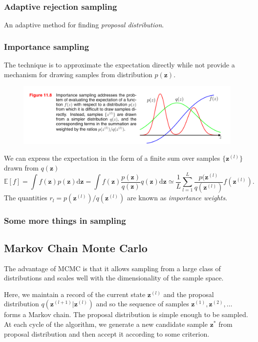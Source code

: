 \documentclass[a4paper]{book}
\newcommand{\mbf}{\mathbf}
\newcommand{\ud}{\mathrm{d}}
\newcommand{\zz}{\mbf z}
\newcommand{\Exp}{\mathbb{E}}
\newcommand{\tit}{\textit}
\begin{document}
\subsubsection*{Adaptive rejection sampling}
An adaptive method for finding \tit{proposal distribution}.
\subsubsection*{Importance sampling}
The technique is to approximate the expectation directly while not provide a mechanism for drawing samples from distribution $p(\zz)$.
\begin{figure}
  \centering
  \includegraphics[width=\textwidth]{./imgs/fig3_4_1.png}
  \label{fig3.4.1}
\end{figure}

We can express the expectation in the form of a finite sum over samples $\{\zz^{(l)}\}$ drawn from $q(\zz)$
\begin{equation}\label{}
  \Exp[f]=\int f(\zz)p(\zz)\ud \zz=\int f(\zz)\frac{p(\zz)}{q(\zz)}q(\zz)\ud\zz\simeq\frac{1}{L}\sum_{l=1}^{L}\frac{p(\zz^{(l)}}{q(\zz^{(l)})}f(\zz^{(l)}).
\end{equation}
The quantities $r_l=p(\zz^{(l)})/q(\zz^{(l)})$ are known as \tit{importance weights}.
\subsubsection*{Some more things in sampling}

\subsection{Markov Chain Monte Carlo}
The advantage of MCMC is that it allows sampling from a large class of distributions and scales well with the dimensionality of the sample space.

Here, we maintain a record of the current state $\zz^{(l)}$ and the proposal distribution $q(\zz^{(l+1)}|\zz^{(l)})$ and so the sequence of samples $\zz^{(1)},\zz^{(2)},\dots$ forms a Markov chain. The proposal distribution is simple enough to be sampled. At each cycle of the algorithm, we generate a new candidate sample $\zz^*$ from proposal distribution and then accept it according to some criterion.
\end{document}
